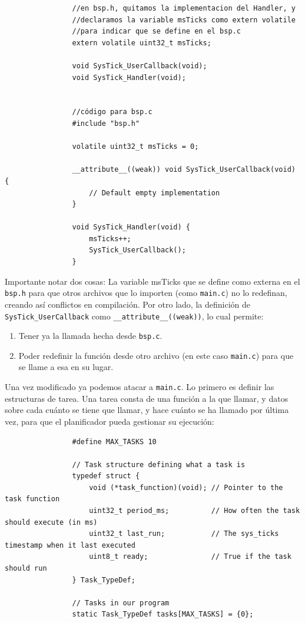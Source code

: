 \documentclass[../main.tex]{subfiles}
\begin{document}
            \begin{lstlisting}
                //en bsp.h, quitamos la implementacion del Handler, y
                //declaramos la variable msTicks como extern volatile
                //para indicar que se define en el bsp.c
                extern volatile uint32_t msTicks;

                void SysTick_UserCallback(void);
                void SysTick_Handler(void);


                //código para bsp.c
                #include "bsp.h"

                volatile uint32_t msTicks = 0;

                __attribute__((weak)) void SysTick_UserCallback(void) {
                    // Default empty implementation
                }

                void SysTick_Handler(void) {
                    msTicks++;
                    SysTick_UserCallback();
                }
            \end{lstlisting}

            Importante notar dos cosas: La variable msTicks que se define como externa en el \texttt{bsp.h} para que otros archivos que lo importen (como \texttt{main.c}) no lo redefinan, creando así conflictos en compilación. Por otro lado, la definición de \texttt{SysTick\_UserCallback} como \lstinline|__attribute__((weak))|, lo cual permite:

            \begin{enumerate}
                \item Tener ya la llamada hecha desde \texttt{bsp.c}.
                \item Poder redefinir la función desde otro archivo (en este caso \texttt{main.c}) para que se llame a esa en su lugar.
            \end{enumerate}
    
            Una vez modificado ya podemos atacar a \texttt{main.c}. Lo primero es definir las estructuras de tarea. Una tarea consta de una función a la que llamar, y datos sobre cada cuánto se tiene que llamar, y hace cuánto se ha llamado por última vez, para que el planificador pueda gestionar su ejecución:

            \begin{lstlisting}
                #define MAX_TASKS 10

                // Task structure defining what a task is
                typedef struct {
                    void (*task_function)(void); // Pointer to the task function
                    uint32_t period_ms;          // How often the task should execute (in ms)
                    uint32_t last_run;           // The sys_ticks timestamp when it last executed
                    uint8_t ready;				 // True if the task should run
                } Task_TypeDef;

                // Tasks in our program
                static Task_TypeDef tasks[MAX_TASKS] = {0};
            \end{lstlisting}
\end{document}
